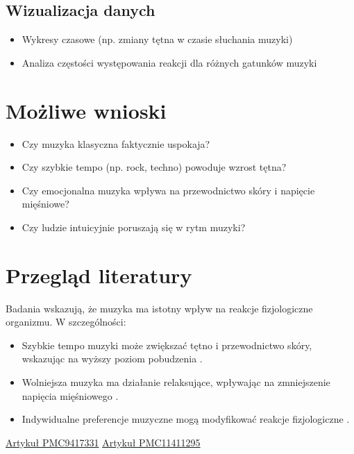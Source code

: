 \documentclass[a4paper,12pt]{article}
\begin{document}
\subsection{Wizualizacja danych}
\begin{itemize}
    \item Wykresy czasowe (np. zmiany tętna w czasie słuchania muzyki)
    \item Analiza częstości występowania reakcji dla różnych gatunków muzyki
\end{itemize}

\section{Możliwe wnioski}
\begin{itemize}
    \item Czy muzyka klasyczna faktycznie uspokaja?
    \item Czy szybkie tempo (np. rock, techno) powoduje wzrost tętna?
    \item Czy emocjonalna muzyka wpływa na przewodnictwo skóry i napięcie mięśniowe?
    \item Czy ludzie intuicyjnie poruszają się w rytm muzyki?
\end{itemize}


\section{Przegląd literatury}
Badania wskazują, że muzyka ma istotny wpływ na reakcje fizjologiczne organizmu. W szczególności:
\begin{itemize}
    \item Szybkie tempo muzyki może zwiększać tętno i przewodnictwo skóry, wskazując na wyższy poziom pobudzenia \cite{PMC9417331}.
    \item Wolniejsza muzyka ma działanie relaksujące, wpływając na zmniejszenie napięcia mięśniowego \cite{PMC11411295}.
    \item Indywidualne preferencje muzyczne mogą modyfikować reakcje fizjologiczne \cite{PMC9417331}.
\end{itemize}


\begin{thebibliography}{9}
 \href{https://pmc.ncbi.nlm.nih.gov/articles/PMC9417331/}{Artykuł PMC9417331}
 \href{https://pmc.ncbi.nlm.nih.gov/articles/PMC11411295/}{Artykuł PMC11411295}
\end{thebibliography}
\end{document}
